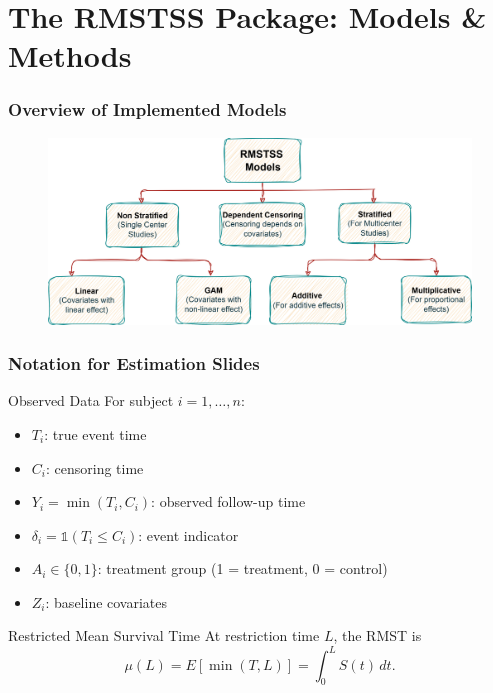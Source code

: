 \documentclass{beamer}
\begin{document}
\section{The RMSTSS Package: Models \& Methods}

\begin{frame}
\frametitle{Overview of Implemented Models}
\begin{figure}
    \centering
    \includegraphics[width=1\linewidth]{images/app-models.png}
\end{figure}
\end{frame}



\begin{frame}
\frametitle{Notation for Estimation Slides}

\begin{block}{Observed Data}
For subject $i=1,\dots,n$:
\begin{itemize}
  \item $T_i$: true event time
  \item $C_i$: censoring time
  \item $Y_i = \min(T_i, C_i)$: observed follow-up time
  \item $\delta_i = \mathbb{1}(T_i \le C_i)$: event indicator
  \item $A_i \in \{0,1\}$: treatment group (1 = treatment, 0 = control)
  \item $Z_i$: baseline covariates
\end{itemize}
\end{block}

\begin{block}{Restricted Mean Survival Time}
At restriction time $L$, the RMST is
\[
\mu(L) = E[\min(T,L)] = \int_0^L S(t)\,dt.
\]
\end{block}

\end{frame}
\end{document}
